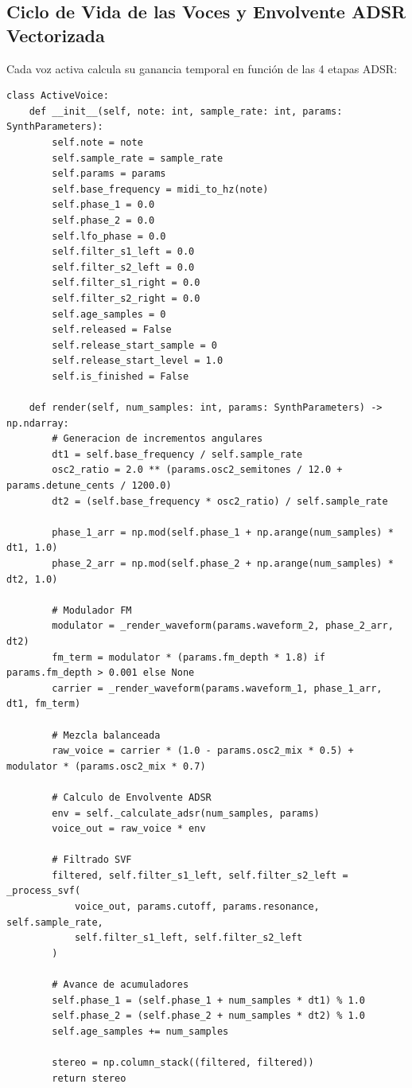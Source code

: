 \documentclass[11pt,a4paper]{article}
\begin{document}
\subsection{Ciclo de Vida de las Voces y Envolvente ADSR Vectorizada}
Cada voz activa calcula su ganancia temporal en función de las 4 etapas ADSR:

\begin{lstlisting}
class ActiveVoice:
    def __init__(self, note: int, sample_rate: int, params: SynthParameters):
        self.note = note
        self.sample_rate = sample_rate
        self.params = params
        self.base_frequency = midi_to_hz(note)
        self.phase_1 = 0.0
        self.phase_2 = 0.0
        self.lfo_phase = 0.0
        self.filter_s1_left = 0.0
        self.filter_s2_left = 0.0
        self.filter_s1_right = 0.0
        self.filter_s2_right = 0.0
        self.age_samples = 0
        self.released = False
        self.release_start_sample = 0
        self.release_start_level = 1.0
        self.is_finished = False

    def render(self, num_samples: int, params: SynthParameters) -> np.ndarray:
        # Generacion de incrementos angulares
        dt1 = self.base_frequency / self.sample_rate
        osc2_ratio = 2.0 ** (params.osc2_semitones / 12.0 + params.detune_cents / 1200.0)
        dt2 = (self.base_frequency * osc2_ratio) / self.sample_rate

        phase_1_arr = np.mod(self.phase_1 + np.arange(num_samples) * dt1, 1.0)
        phase_2_arr = np.mod(self.phase_2 + np.arange(num_samples) * dt2, 1.0)

        # Modulador FM
        modulator = _render_waveform(params.waveform_2, phase_2_arr, dt2)
        fm_term = modulator * (params.fm_depth * 1.8) if params.fm_depth > 0.001 else None
        carrier = _render_waveform(params.waveform_1, phase_1_arr, dt1, fm_term)

        # Mezcla balanceada
        raw_voice = carrier * (1.0 - params.osc2_mix * 0.5) + modulator * (params.osc2_mix * 0.7)

        # Calculo de Envolvente ADSR
        env = self._calculate_adsr(num_samples, params)
        voice_out = raw_voice * env

        # Filtrado SVF
        filtered, self.filter_s1_left, self.filter_s2_left = _process_svf(
            voice_out, params.cutoff, params.resonance, self.sample_rate,
            self.filter_s1_left, self.filter_s2_left
        )

        # Avance de acumuladores
        self.phase_1 = (self.phase_1 + num_samples * dt1) % 1.0
        self.phase_2 = (self.phase_2 + num_samples * dt2) % 1.0
        self.age_samples += num_samples

        stereo = np.column_stack((filtered, filtered))
        return stereo
\end{lstlisting}
\end{document}
